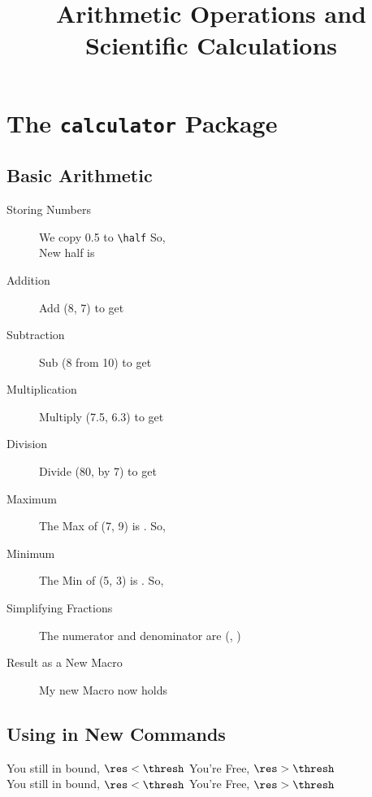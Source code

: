 \documentclass{article}
\title{\bf Arithmetic Operations and Scientific 				Calculations}
\date{}
\begin{document}
	\maketitle
	
	\section{The \texttt{calculator} Package}
	
	\subsection{Basic Arithmetic}
	\begin{description}
		\item[Storing Numbers]
			We copy 0.5 to \verb|\half| 
			So, \half \\
			\COPY{\half}{\newhalf} New half is \newhalf
		\item[Addition] 
			Add (8, 7) to get 
			 \added
		\item[Subtraction] 
			Sub (8 from 10) to get
			 \subt  
		\item[Multiplication] 
			Multiply (7.5, 6.3)	
			to get  \mult
		\item[Division] 
			Divide (80, by 7) to get
			 \div
		\item[Maximum] The Max of (7, 9) is 
			. So, \nine
		\item[Minimum] The Min of (5, 3) is
			. So, \three
		\item[Simplifying Fractions]
			The numerator and denominator are
			(\numer, \denom) 
		\item[Result as a New Macro]
			\newcommand{\ValueAdded}{}
			\ADD{8}{8}{\ValueAdded} 
			My new Macro now holds \ValueAdded
	\end{description}
	
	\subsection{Using in New Commands}
	\newcommand{\decision}[3]{
		\POWER{#1}{#2}{\res}
		\COPY{#3}{\thresh}
		\ifthenelse{\res < \thresh}
			{You still in bound, $\res < \thresh$}						{You're Free,  $\res > \thresh$}
	} 
	\decision{1}{3}{50} \\[3pt]
	\decision{3}{3}{25}
	
\end{document}
